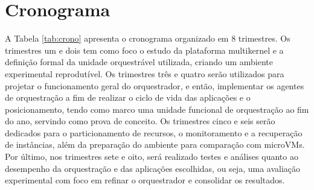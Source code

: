\documentclass[12pt]{article}
\begin{document}
\section{Cronograma} \label{sec:crono}

A Tabela \ref{tab:crono} apresenta o cronograma organizado em 8 trimestres.
Os trimestres um e dois tem como foco o estudo da plataforma multikernel e a definição formal da unidade orquestrável utilizada, criando
um ambiente experimental reprodutível.
Os trimestres três e quatro serão utilizados para projetar o funcionamento geral do orquestrador, e então, implementar os agentes
de orquestração a fim de realizar o ciclo de vida das aplicações e o posicionamento, tendo como marco uma unidade funcional de
orquestração ao fim do ano, servindo como prova de conceito.
Os trimestres cinco e seis serão dedicados para o particionamento de recursos, o monitoramento e a
recuperação de instâncias, além da preparação do ambiente para comparação com microVMs.
Por último, nos trimestres sete e oito, será realizado testes e análises quanto ao desempenho da orquestração
e das aplicações escolhidas, ou seja, uma avaliação experimental com foco em refinar o orquestrador e consolidar os resultados.
\end{document}
